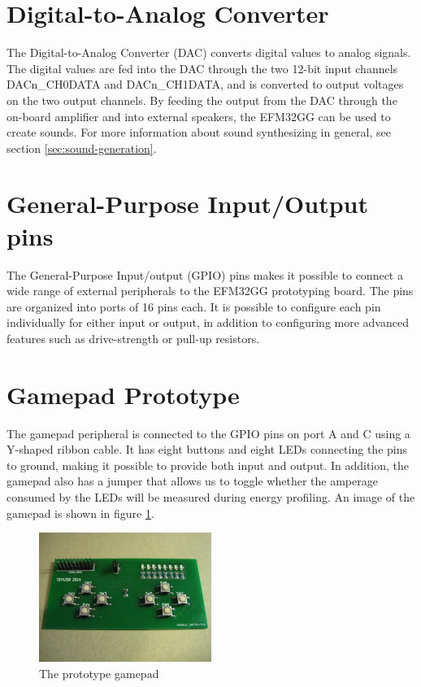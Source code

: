 \section{Digital-to-Analog Converter}
The Digital-to-Analog Converter (DAC) converts digital values to analog signals. The digital values are fed into the DAC through the two 12-bit input channels DACn\_CH0DATA and DACn\_CH1DATA, and is converted to output voltages on the two output channels. By feeding the output from the DAC through the on-board amplifier and into external speakers, the EFM32GG can be used to create sounds. For more information about sound synthesizing in general, see section \ref{sec:sound-generation}.


\section{General-Purpose Input/Output pins}
The General-Purpose Input/output (GPIO) pins makes it possible to connect a wide range of external peripherals to the EFM32GG prototyping board. The pins are organized into ports of 16 pins each. It is possible to configure each pin individually for either input or output, in addition to configuring more advanced features such as drive-strength or pull-up resistors.


\section{Gamepad Prototype}
The gamepad peripheral is connected to the GPIO pins on port A and C using a Y-shaped ribbon cable. It has eight buttons and eight LEDs connecting the pins to ground, making it possible to provide both input and output. In addition, the gamepad also has a jumper that allows us to toggle whether the amperage consumed by the LEDs will be measured during energy profiling. An image of the gamepad is shown in figure \ref{fig:gamepad}.

\begin{figure}[ht]
  \centering
  \includegraphics[width=0.5\textwidth]{images/gamepad.jpg}
  \caption{The prototype gamepad}\label{fig:gamepad}
\end{figure}


